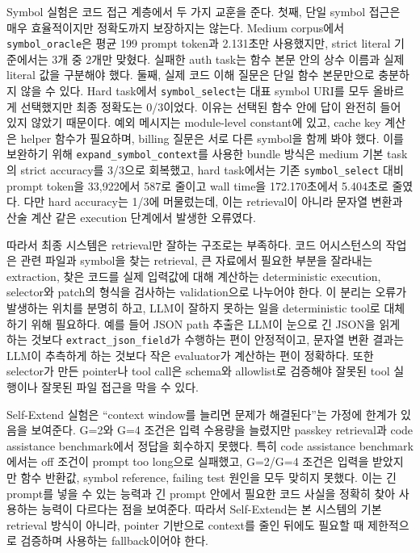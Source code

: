 \documentclass[11pt,a4paper]{article}
\begin{document}
Symbol 실험은 코드 접근 계층에서 두 가지 교훈을 준다. 첫째, 단일 symbol 접근은 매우 효율적이지만 정확도까지 보장하지는 않는다. Medium corpus에서 \texttt{symbol\_oracle}은 평균 199 prompt token과 2.131초만 사용했지만, strict literal 기준에서는 3개 중 2개만 맞혔다. 실패한 auth task는 함수 본문 안의 상수 이름과 실제 literal 값을 구분해야 했다. 둘째, 실제 코드 이해 질문은 단일 함수 본문만으로 충분하지 않을 수 있다. Hard task에서 \texttt{symbol\_select}는 대표 symbol URI를 모두 올바르게 선택했지만 최종 정확도는 0/3이었다. 이유는 선택된 함수 안에 답이 완전히 들어 있지 않았기 때문이다. 예외 메시지는 module-level constant에 있고, cache key 계산은 helper 함수가 필요하며, billing 질문은 서로 다른 symbol을 함께 봐야 했다. 이를 보완하기 위해 \texttt{expand\_symbol\_context}를 사용한 bundle 방식은 medium 기본 task의 strict accuracy를 3/3으로 회복했고, hard task에서는 기존 \texttt{symbol\_select} 대비 prompt token을 33,922에서 587로 줄이고 wall time을 172.170초에서 5.404초로 줄였다. 다만 hard accuracy는 1/3에 머물렀는데, 이는 retrieval이 아니라 문자열 변환과 산술 계산 같은 execution 단계에서 발생한 오류였다.

따라서 최종 시스템은 retrieval만 잘하는 구조로는 부족하다. 코드 어시스턴스의 작업은 관련 파일과 symbol을 찾는 retrieval, 큰 자료에서 필요한 부분을 잘라내는 extraction, 찾은 코드를 실제 입력값에 대해 계산하는 deterministic execution, selector와 patch의 형식을 검사하는 validation으로 나누어야 한다. 이 분리는 오류가 발생하는 위치를 분명히 하고, LLM이 잘하지 못하는 일을 deterministic tool로 대체하기 위해 필요하다. 예를 들어 JSON path 추출은 LLM이 눈으로 긴 JSON을 읽게 하는 것보다 \texttt{extract\_json\_field}가 수행하는 편이 안정적이고, 문자열 변환 결과는 LLM이 추측하게 하는 것보다 작은 evaluator가 계산하는 편이 정확하다. 또한 selector가 만든 pointer나 tool call은 schema와 allowlist로 검증해야 잘못된 tool 실행이나 잘못된 파일 접근을 막을 수 있다.

Self-Extend 실험은 ``context window를 늘리면 문제가 해결된다''는 가정에 한계가 있음을 보여준다. G=2와 G=4 조건은 입력 수용량을 늘렸지만 passkey retrieval과 code assistance benchmark에서 정답을 회수하지 못했다. 특히 code assistance benchmark에서는 off 조건이 prompt too long으로 실패했고, G=2/G=4 조건은 입력을 받았지만 함수 반환값, symbol reference, failing test 원인을 모두 맞히지 못했다. 이는 긴 prompt를 넣을 수 있는 능력과 긴 prompt 안에서 필요한 코드 사실을 정확히 찾아 사용하는 능력이 다르다는 점을 보여준다. 따라서 Self-Extend는 본 시스템의 기본 retrieval 방식이 아니라, pointer 기반으로 context를 줄인 뒤에도 필요할 때 제한적으로 검증하며 사용하는 fallback이어야 한다.
\end{document}
